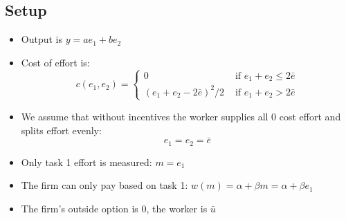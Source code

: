 \documentclass{article}
\begin{document}
\subsection{Setup}
\begin{itemize}
    \item Output is $y=a e_1+b e_2$
    \item Cost of effort is:
       \[c(e_1, e_2) = \begin{cases}
            0 & \text{ if }  e_1+e_2 \leq 2 \bar e \\
            (e_1+e_2-2\bar e)^2/2 & \text{ if } e_1+e_2 > 2 \bar e 
        \end{cases}\]
      \item We assume that without incentives the worker supplies all 0 cost effort and splits effort evenly:
      \[e_1=e_2=\bar e\]
    \item Only task 1 effort is measured: $m=e_1$
    \item The firm can only pay based on task 1: $w(m)=\alpha + \beta m =\alpha + \beta e_1$
    \item The firm's outside option is 0, the worker is $\bar u$
\end{itemize}
\end{document}
